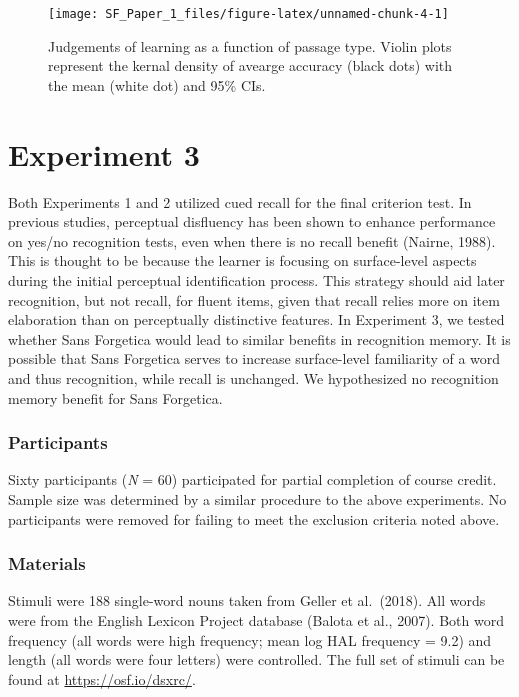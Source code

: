 \documentclass[
  english,
  jou]{apa6}
\begin{document}
\begin{figure}

{\centering \texttt{[image: SF\_Paper\_1\_files/figure-latex/unnamed-chunk-4-1]} 

}

\caption{Judgements of learning as a function of passage type. Violin plots represent the kernal density of avearge accuracy (black dots) with the mean (white dot) and 95\% CIs.}\label{fig:unnamed-chunk-4}
\end{figure}

\hypertarget{experiment-3}{%
\section{Experiment 3}\label{experiment-3}}

Both Experiments 1 and 2 utilized cued recall for the final criterion test. In previous studies, perceptual disfluency has been shown to enhance performance on yes/no recognition tests, even when there is no recall benefit (Nairne, 1988). This is thought to be because the learner is focusing on surface-level aspects during the initial perceptual identification process. This strategy should aid later recognition, but not recall, for fluent items, given that recall relies more on item elaboration than on perceptually distinctive features. In Experiment 3, we tested whether Sans Forgetica would lead to similar benefits in recognition memory. It is possible that Sans Forgetica serves to increase surface-level familiarity of a word and thus recognition, while recall is unchanged. We hypothesized no recognition memory benefit for Sans Forgetica.

\hypertarget{participants-2}{%
\subsubsection{Participants}\label{participants-2}}

Sixty participants (\emph{N} = 60) participated for partial completion of course credit. Sample size was determined by a similar procedure to the above experiments. No participants were removed for failing to meet the exclusion criteria noted above.

\hypertarget{materials-1}{%
\subsubsection{Materials}\label{materials-1}}

Stimuli were 188 single-word nouns taken from Geller et al.~(2018). All words were from the English Lexicon Project database (Balota et al., 2007). Both word frequency (all words were high frequency; mean log HAL frequency = 9.2) and length (all words were four letters) were controlled. The full set of stimuli can be found at \url{https://osf.io/dsxrc/}.
\end{document}
